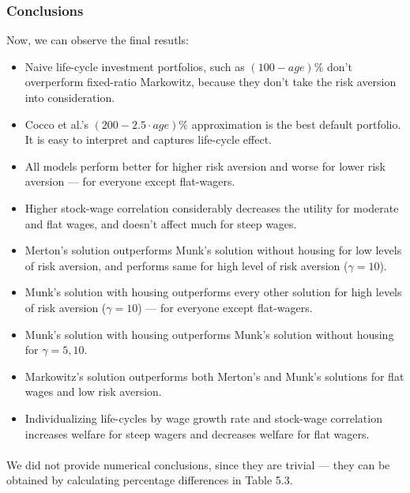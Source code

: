 \documentclass[]{elsarticle}
\begin{document}
\subsubsection{Conclusions}
Now, we can observe the final resutls:

\begin{itemize}

\item Naive life-cycle investment portfolios, such as $(100-age)\%$ don't overperform fixed-ratio Markowitz, because they don't take the risk aversion into consideration.
\item Cocco et al.'s $(200-2.5\cdot age)\%$ approximation is the best default portfolio. It is easy to interpret and captures life-cycle effect.
\item All models perform better for higher risk aversion and worse for lower risk aversion --- for everyone except flat-wagers.
\item Higher stock-wage correlation considerably decreases the utility for moderate and flat wages, and doesn't affect much for steep wages.
\item Merton's solution outperforms Munk's solution without housing for low levels of risk aversion, and performs same for high level of risk aversion ($\gamma=10$).
\item Munk's solution with housing outperforms every other solution for high levels of risk aversion ($\gamma=10$) --- for everyone except flat-wagers.
\item Munk's solution with housing outperforms Munk's solution without housing for $\gamma=5,10$.
\item Markowitz's solution outperforms both Merton's and Munk's solutions for flat wages and low risk aversion.
\item Individualizing life-cycles by wage growth rate and stock-wage correlation increases welfare for steep wagers and decreases welfare for flat wagers.
\end{itemize}

\paragraph{}We did not provide numerical conclusions, since they are trivial --- they can be obtained by calculating percentage differences in Table 5.3.
\end{document}
